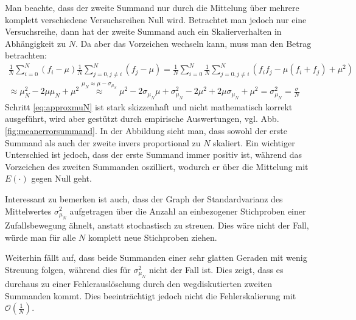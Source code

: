 \documentclass[german,bibnum,beleg,zihtitle,german,hyperref,utf8]{zihpub}
\begin{document}
Man beachte, dass der zweite Summand nur durch die Mittelung über mehrere komplett verschiedene Versuchsreihen Null wird. Betrachtet man jedoch nur eine Versuchsreihe, dann hat der zweite Summand auch ein Skalierverhalten in Abhängigkeit zu $N$. Da aber das Vorzeichen wechseln kann, muss man den Betrag betrachten:
\begin{align}
	\frac{1}{N} \sum\limits_{i=0}^N \left( f_i-\mu \right)
    \frac{1}{N} \sum\limits_{j=0,j\neq i}^N \left( f_j-\mu \right)
    =
	\frac{1}{N} \sum\limits_{i=0}^N 
    \frac{1}{N} \sum\limits_{j=0,j\neq i}^N
    \left( f_i f_j - \mu \left( f_i + f_j \right) + \mu^2 \right)
    \\
    \label{eq:approxmuN}
    \approx
	\mu_N^2 - 2 \mu \mu_N + \mu^2
	\overset{ \mu_N \approx \mu - \sigma_{\mu_N} }{\approx}
	\mu^2 - 2 \sigma_{\mu_N} \mu + \sigma_{\mu_N}^2
	- 2\mu^2 + 2\mu \sigma_{\mu_N} + \mu^2
	= \sigma_{\mu_N}^2 = \frac{\sigma}{N}
\end{align}
Schritt \ref{eq:approxmuN} ist stark skizzenhaft und nicht mathematisch korrekt ausgeführt, wird aber gestützt durch empirische Auswertungen, vgl. Abb.\ref{fig:meanerrorsummand}. In der Abbildung sieht man, dass sowohl der erste Summand als auch der zweite invers proportional zu $N$ skaliert. Ein wichtiger Unterschied ist jedoch, dass der erste Summand immer positiv ist, während das Vorzeichen des zweiten Summanden oszilliert, wodurch er über die Mittelung mit $E(\cdot)$ gegen Null geht.

Interessant zu bemerken ist auch, dass der Graph der Standardvarianz des Mittelwertes $\sigma_{\mu_N}^2$ aufgetragen über die Anzahl an einbezogener Stichproben einer Zufallsbewegung ähnelt, anstatt stochastisch zu streuen. Dies wäre nicht der Fall, würde man für alle $N$ komplett neue Stichproben ziehen. 

Weiterhin fällt auf, dass beide Summanden einer sehr glatten Geraden mit wenig Streuung folgen, während dies für $\sigma_{\mu_N}^2$ nicht der Fall ist. Dies zeigt, dass es durchaus zu einer Fehlerauslöschung durch den wegdiskutierten zweiten Summanden kommt. Dies beeinträchtigt jedoch nicht die Fehlerskalierung mit $\mathcal{O}\left( \frac{1}{N} \right)$.
\end{document}
